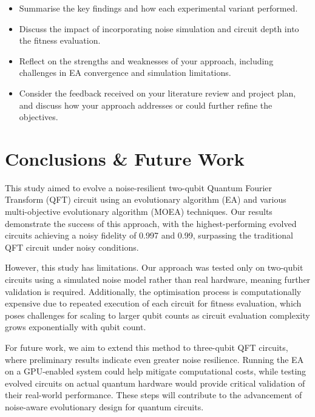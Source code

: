 \documentclass[11pt,a4paper]{article}
\begin{document}
\begin{itemize}
  \item Summarise the key findings and how each experimental variant performed.
  \item Discuss the impact of incorporating noise simulation and circuit depth into the fitness evaluation.
  \item Reflect on the strengths and weaknesses of your approach, including challenges in EA convergence and simulation limitations.
  \item Consider the feedback received on your literature review and project plan, and discuss how your approach addresses or could further refine the objectives.
\end{itemize}

%
%
\section{Conclusions \& Future Work}\label{sec:conclusion}
This study aimed to evolve a noise-resilient two-qubit Quantum Fourier Transform (QFT) circuit using an evolutionary algorithm (EA) and various multi-objective evolutionary algorithm (MOEA) techniques. Our results demonstrate the success of this approach, with the highest-performing evolved circuits achieving a noisy fidelity of 0.997 and 0.99, surpassing the traditional QFT circuit under noisy conditions.\newline

However, this study has limitations. Our approach was tested only on two-qubit circuits using a simulated noise model rather than real hardware, meaning further validation is required. Additionally, the optimisation process is computationally expensive due to repeated execution of each circuit for fitness evaluation, which poses challenges for scaling to larger qubit counts as circuit evaluation complexity grows exponentially with qubit count.\newline

For future work, we aim to extend this method to three-qubit QFT circuits, where preliminary results indicate even greater noise resilience. Running the EA on a GPU-enabled system could help mitigate computational costs, while testing evolved circuits on actual quantum hardware would provide critical validation of their real-world performance. These steps will contribute to the advancement of noise-aware evolutionary design for quantum circuits.
\end{document}
